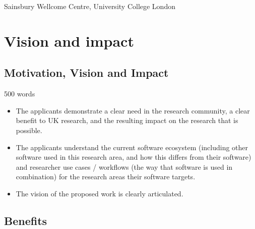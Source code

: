 \documentclass[12pt]{article}
\newenvironment{instruction}{%
    \begin{tcolorbox}[breakable,colback=red!5,colframe=red,title=Instruction]%
	}{%
    	\end{tcolorbox}%
	}
\begin{document}
Sainsbury Wellcome Centre, University College London

\pagebreak

\section{Vision and impact}

\subsection{Motivation, Vision and Impact}

\begin{instruction}
    500 words

    \begin{itemize}

        \item The applicants demonstrate a clear need in the research community,
            a clear benefit to UK research, and the resulting impact on the
            research that is possible.

        \item The applicants understand the current software ecosystem (including
            other software used in this research area, and how this differs
            from their software) and researcher use cases / workflows (the way
            that software is used in combination) for the research areas their
            software targets.

        \item The vision of the proposed work is clearly articulated.

    \end{itemize}

\end{instruction}



\subsection{Benefits}
\end{document}

